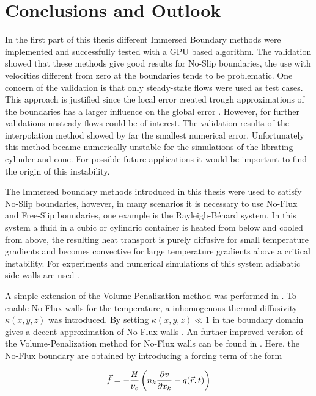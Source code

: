 \chapter{Conclusions and Outlook}

In the first part of this thesis different Immersed Boundary methods were
implemented and successfully tested with a GPU based algorithm.
The validation showed that these methods give good results for No-Slip boundaries,
the use with velocities different from zero at the boundaries tends to be problematic.
One concern of the validation is that only steady-state flows were used as test cases.
This approach is justified since the local error created trough approximations of the boundaries
has a larger influence on the global error .
However, for further validations unsteady flows could be of interest.
The validation results of the interpolation method showed by far the smallest numerical error.
Unfortunately this method became numerically unstable for the simulations of the librating cylinder and cone.
For possible future applications it would be important to find the origin of this instability.

The Immersed boundary methods introduced in this thesis were used to satisfy No-Slip boundaries, however,
in many scenarios it is necessary to use No-Flux and Free-Slip boundaries, one example is the Rayleigh-B\'{e}nard system.
In this system a fluid in a cubic or cylindric container is heated from below and cooled from above, the resulting
heat transport is purely diffusive for small temperature gradients and
becomes convective for large temperature gradients above a critical instability.
For experiments and numerical simulations of this system adiabatic side walls are used \citep{Lulff2011}.

A simple extension of the Volume-Penalization method was performed in \citep{Lulff2011}.
To enable No-Flux walls for the temperature, a inhomogenous thermal diffusivity $\kappa (x, y, z)$ was introduced.
By setting $\kappa(x, y, z) \ll 1$ in the boundary domain gives a decent approximation of No-Flux walls \citep{Lulff2011}.
An further improved version of the Volume-Penalization method for No-Flux walls can be found in \citep{Brown-Dymkoski2014}.
Here, the No-Flux boundary are obtained by introducing a forcing term of the form

\begin{align}
    \vec{f}  = -\frac{H}{\nu_c}\left( n_k\pdn[v]{x_k} - q(\vec{r}, t) \right)
\end{align}

